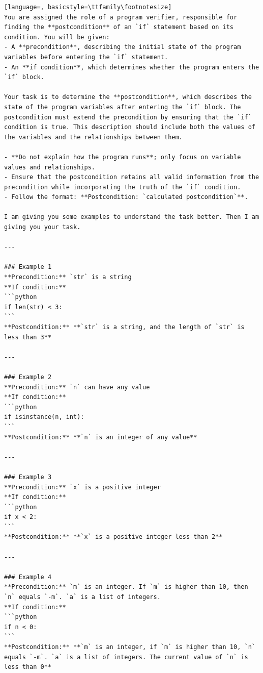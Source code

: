 \documentclass[sigconf]{acmart}
\begin{document}
\begin{tcolorbox}[ colback=gray!10, colframe=black, arc=5pt]
\begin{lstlisting}[language=, basicstyle=\ttfamily\footnotesize]
You are assigned the role of a program verifier, responsible for finding the **postcondition** of an `if` statement based on its condition. You will be given:
- A **precondition**, describing the initial state of the program variables before entering the `if` statement.
- An **if condition**, which determines whether the program enters the `if` block.

Your task is to determine the **postcondition**, which describes the state of the program variables after entering the `if` block. The postcondition must extend the precondition by ensuring that the `if` condition is true. This description should include both the values of the variables and the relationships between them.

- **Do not explain how the program runs**; only focus on variable values and relationships.
- Ensure that the postcondition retains all valid information from the precondition while incorporating the truth of the `if` condition.
- Follow the format: **Postcondition: `calculated postcondition`**.

I am giving you some examples to understand the task better. Then I am giving you your task.

---

### Example 1  
**Precondition:** `str` is a string  
**If condition:**  
```python
if len(str) < 3:
```
**Postcondition:** **`str` is a string, and the length of `str` is less than 3**

---

### Example 2  
**Precondition:** `n` can have any value  
**If condition:**  
```python
if isinstance(n, int):
```
**Postcondition:** **`n` is an integer of any value**

---

### Example 3  
**Precondition:** `x` is a positive integer  
**If condition:**  
```python
if x < 2:
```
**Postcondition:** **`x` is a positive integer less than 2**

---

### Example 4  
**Precondition:** `m` is an integer. If `m` is higher than 10, then `n` equals `-m`. `a` is a list of integers.  
**If condition:**  
```python
if n < 0:
```
**Postcondition:** **`m` is an integer, if `m` is higher than 10, `n` equals `-m`. `a` is a list of integers. The current value of `n` is less than 0**

\end{lstlisting}
\end{tcolorbox}
\end{document}
